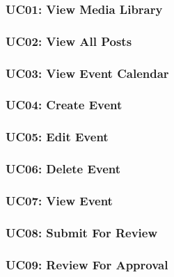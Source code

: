 \documentclass{article}
\begin{document}
\subsubsection{UC01: View Media Library}

\subsubsection{UC02: View All Posts}

\subsubsection{UC03: View Event Calendar}

\subsubsection{UC04: Create Event}

\subsubsection{UC05: Edit Event}

\subsubsection{UC06: Delete Event}

\subsubsection{UC07: View Event}

\subsubsection{UC08: Submit For Review}

\subsubsection{UC09: Review For Approval}

\end{document}

